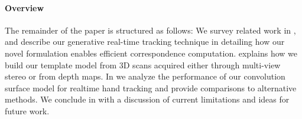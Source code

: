 %

\paragraph{Overview}
The remainder of the paper is structured as follows: We survey related work in , and describe our generative real-time tracking technique in  detailing how our novel formulation enables efficient correspondence computation.
% 
 explains how we build our template model from 3D scans acquired either through multi-view stereo or from depth maps.
% 
In  we analyze the performance of our convolution surface model for realtime hand tracking and provide comparisons to alternative methods. 
% 
We conclude in  with a discussion of current limitations and ideas for future work.
 

 \\




